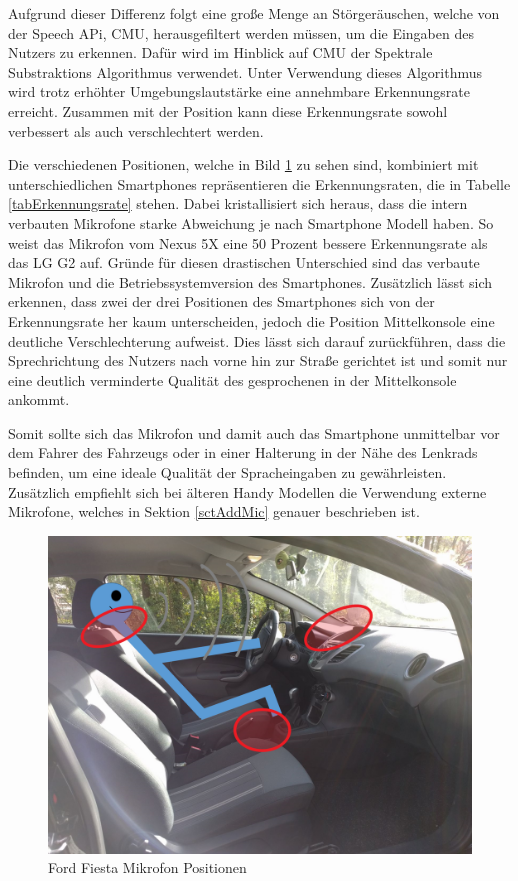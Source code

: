 Aufgrund dieser Differenz folgt eine große Menge an Störgeräuschen, welche von der Speech APi, \ac{CMU}, herausgefiltert werden müssen, um die Eingaben des Nutzers zu erkennen. Dafür wird im Hinblick auf \ac{CMU} der Spektrale Substraktions Algorithmus verwendet. Unter Verwendung dieses Algorithmus wird trotz erhöhter Umgebungslautstärke eine annehmbare Erkennungsrate erreicht. Zusammen mit der Position kann diese Erkennungsrate sowohl verbessert als auch verschlechtert werden. 

Die verschiedenen Positionen, welche in Bild \ref{figMikroPositionen} zu sehen sind, kombiniert mit unterschiedlichen Smartphones repräsentieren die Erkennungsraten, die in Tabelle \ref{tabErkennungsrate} stehen. Dabei kristallisiert sich heraus, dass die intern verbauten Mikrofone starke Abweichung je nach Smartphone Modell haben. So weist das Mikrofon vom Nexus 5X eine 50 Prozent bessere Erkennungsrate als das LG G2 auf. Gründe für diesen drastischen Unterschied sind das verbaute Mikrofon und die Betriebssystemversion des Smartphones. Zusätzlich lässt sich erkennen, dass zwei der drei Positionen des Smartphones sich von der Erkennungsrate her kaum unterscheiden, jedoch die Position Mittelkonsole eine deutliche Verschlechterung aufweist.
Dies lässt sich darauf zurückführen, dass die Sprechrichtung des Nutzers nach vorne hin zur Straße gerichtet ist und somit nur eine deutlich verminderte Qualität des gesprochenen in der Mittelkonsole ankommt.

Somit sollte sich das Mikrofon und damit auch das Smartphone unmittelbar vor dem Fahrer des Fahrzeugs oder in einer Halterung in der Nähe des Lenkrads befinden, um eine ideale Qualität der Spracheingaben zu gewährleisten. Zusätzlich empfiehlt sich bei älteren Handy Modellen die Verwendung externe Mikrofone, welches in Sektion \ref{sctAddMic} genauer beschrieben ist. 

\begin{figure}[h]
	\centering
  \includegraphics[scale=0.3]{images/position_waves.png}
	\caption{Ford Fiesta Mikrofon Positionen}
	\label{figMikroPositionen}
\end{figure}

